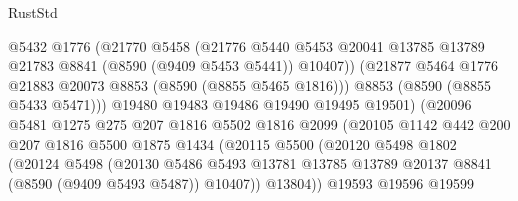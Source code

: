 \begin{lexlean}{RustStd}
\begin{coremodule}
                                @5432
                                @1776
                                (@21770
                                  @5458
                                  (@21776
                                    @5440
                                    @5453
                                    @20041
                                    @13785
                                    @13789
                                    @21783
                                    @8841
                                    (@8590 (@9409 @5453 @5441))
                                    @10407))
                                (@21877 @5464 @1776 @21883 @20073 @8853 (@8590 (@8855 @5465 @1816)))
                                @8853
                                (@8590 (@8855 @5433 @5471)))
                              @19480
                              @19483
                              @19486
                              @19490
                              @19495
                              @19501)
                            (@20096
                              @5481
                              @1275
                              @275
                              @207
                              @1816
                              @5502
                              @1816
                              @2099
                              (@20105
                                @1142
                                @442
                                @200
                                @207
                                @1816
                                @5500
                                @1875
                                @1434
                                (@20115
                                  @5500
                                  (@20120
                                    @5498
                                    @1802
                                    (@20124
                                      @5498
                                      (@20130
                                        @5486
                                        @5493
                                        @13781
                                        @13785
                                        @13789
                                        @20137
                                        @8841
                                        (@8590 (@9409 @5493 @5487))
                                        @10407))
                                    @13804))
                                @19593
                                @19596
                                @19599

\end{coremodule}
\end{lexlean}
